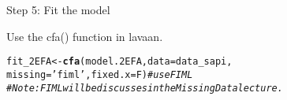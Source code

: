 \documentclass[10pt]{beamer}\usepackage[]{graphicx}\usepackage[]{xcolor}
\makeatletter
\newcommand{\hlsng}[1]{\textcolor[rgb]{0.192,0.494,0.8}{#1}}%
\newcommand{\hlcom}[1]{\textcolor[rgb]{0.678,0.584,0.686}{\textit{#1}}}%
\newcommand{\hldef}[1]{\textcolor[rgb]{0.345,0.345,0.345}{#1}}%
\newcommand{\hlkwb}[1]{\textcolor[rgb]{0.69,0.353,0.396}{#1}}%
\newcommand{\hlkwc}[1]{\textcolor[rgb]{0.333,0.667,0.333}{#1}}%
\newcommand{\hlkwd}[1]{\textcolor[rgb]{0.737,0.353,0.396}{\textbf{#1}}}%
\newenvironment{kframe}{%
 \def\at@end@of@kframe{}%
 \ifinner\ifhmode%
  \def\at@end@of@kframe{\end{minipage}}%
  \begin{minipage}{\columnwidth}%
 \fi\fi%
 \def\FrameCommand##1{\hskip\@totalleftmargin \hskip-\fboxsep
 \colorbox{shadecolor}{##1}\hskip-\fboxsep
     \hskip-\linewidth \hskip-\@totalleftmargin \hskip\columnwidth}%
 \MakeFramed {\advance\hsize-\width
   \@totalleftmargin\z@ \linewidth\hsize
   \@setminipage}}%
 {\par\unskip\endMakeFramed%
 \at@end@of@kframe}
\newenvironment{knitrout}{}{} %
\makeatother
\begin{document}
%
\begin{frame}[fragile]{Step 5: Fit the model}

Use the cfa() function in lavaan.

\begin{knitrout}
\color{fgcolor}\begin{kframe}
\begin{alltt}
\hldef{fit_2EFA} \hlkwb{<-} \hlkwd{cfa}\hldef{(model.2EFA,} \hlkwc{data}\hldef{=data_sapi,}
                \hlkwc{missing}\hldef{=}\hlsng{'fiml'}\hldef{,} \hlkwc{fixed.x}\hldef{=F)}  \hlcom{# use FIML}
\hlcom{# Note: FIML will be discusses in the Missing Data lecture.}
\end{alltt}
\end{kframe}
\end{knitrout}
\end{frame}
%
\end{document}

